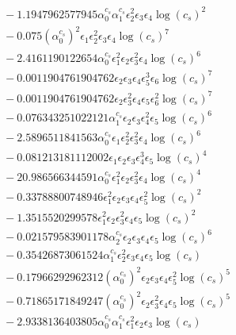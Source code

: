 \documentclass[10pt]{article}
\begin{document}
\begin{align*}
&{}  - 1.1947962577945 \alpha_{0}^{c_s} \alpha_{1}^{c_s} \epsilon_{2}^{2} \epsilon_{3} \epsilon_{4} \log{\left(c_{s} \right)}^{2} \\
&{}  - 0.075 \left(\alpha_{0}^{c_s}\right)^{2} \epsilon_{1} \epsilon_{2}^{2} \epsilon_{3} \epsilon_{4} \log{\left(c_{s} \right)}^{7} \\
&{}  - 2.4161190122654 \alpha_{0}^{c_s} \epsilon_{1}^{2} \epsilon_{2} \epsilon_{3}^{2} \epsilon_{4} \log{\left(c_{s} \right)}^{6} \\
&{}  - 0.0011904761904762 \epsilon_{2} \epsilon_{3} \epsilon_{4} \epsilon_{5}^{3} \epsilon_{6} \log{\left(c_{s} \right)}^{7} \\
&{}  - 0.0011904761904762 \epsilon_{2} \epsilon_{3}^{2} \epsilon_{4} \epsilon_{5} \epsilon_{6}^{2} \log{\left(c_{s} \right)}^{7} \\
&{}  - 0.076343251022121 \alpha_{1}^{c_s} \epsilon_{2} \epsilon_{3} \epsilon_{4}^{2} \epsilon_{5} \log{\left(c_{s} \right)}^{6} \\
&{}  - 2.5896511841563 \alpha_{0}^{c_s} \epsilon_{1} \epsilon_{2}^{2} \epsilon_{3}^{2} \epsilon_{4} \log{\left(c_{s} \right)}^{6} \\
&{}  - 0.081213181112002 \epsilon_{1} \epsilon_{2} \epsilon_{3} \epsilon_{4}^{3} \epsilon_{5} \log{\left(c_{s} \right)}^{4} \\
&{}  - 20.986566344591 \alpha_{0}^{c_s} \epsilon_{1}^{2} \epsilon_{2} \epsilon_{3}^{2} \epsilon_{4} \log{\left(c_{s} \right)}^{4} \\
&{}  - 0.33788800748946 \epsilon_{1}^{2} \epsilon_{2} \epsilon_{3} \epsilon_{4} \epsilon_{5}^{2} \log{\left(c_{s} \right)}^{2} \\
&{}  - 1.3515520299578 \epsilon_{1}^{2} \epsilon_{2} \epsilon_{3}^{2} \epsilon_{4} \epsilon_{5} \log{\left(c_{s} \right)}^{2} \\
&{}  - 0.021579583901178 \alpha_{2}^{c_s} \epsilon_{2} \epsilon_{3} \epsilon_{4} \epsilon_{5} \log{\left(c_{s} \right)}^{6} \\
&{}  - 0.35426873061524 \alpha_{1}^{c_s} \epsilon_{2}^{2} \epsilon_{3} \epsilon_{4} \epsilon_{5} \log{\left(c_{s} \right)} \\
&{}  - 0.17966292962312 \left(\alpha_{0}^{c_s}\right)^{2} \epsilon_{2} \epsilon_{3} \epsilon_{4} \epsilon_{5}^{2} \log{\left(c_{s} \right)}^{5} \\
&{}  - 0.71865171849247 \left(\alpha_{0}^{c_s}\right)^{2} \epsilon_{2} \epsilon_{3}^{2} \epsilon_{4} \epsilon_{5} \log{\left(c_{s} \right)}^{5} \\
&{}  - 2.9338136403805 \alpha_{0}^{c_s} \alpha_{1}^{c_s} \epsilon_{1}^{2} \epsilon_{2} \epsilon_{3} \log{\left(c_{s} \right)} \\

\end{align*}
\end{document}
